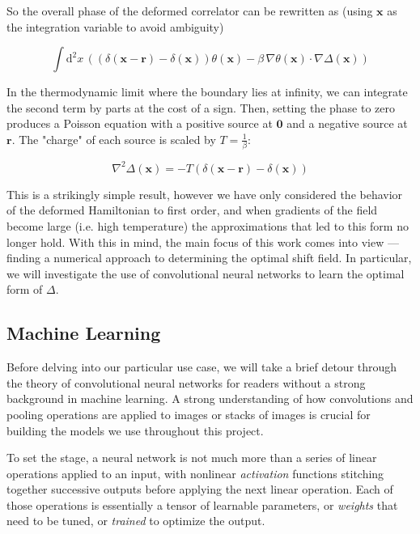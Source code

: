 \documentclass[12pt]{article}
\begin{document}
So the overall phase of the deformed correlator can be rewritten as (using $\mathbf{x}$ as the integration variable to avoid ambiguity)

\begin{equation}
	\int \mathrm{d}^2x \, \left((\delta(\mathbf{x} - \mathbf{r}) - \delta(\mathbf{x}))\theta(\mathbf{x})-\beta \, \nabla\theta(\mathbf{x})\cdot\nabla\Delta(\mathbf{x})\right)
\end{equation}

In the thermodynamic limit where the boundary lies at infinity, we can integrate the second term by parts at the cost of a sign. Then, setting
the phase to zero produces a Poisson equation with a positive source at $\mathbf{0}$ and a negative source at $\mathbf{r}$. The "charge" of each 
source is scaled by $T=\frac{1}{\beta}$:

\begin{equation} \label{eq:Poisson}
	\nabla^2 \Delta(\mathbf{x}) = -T \left( \delta(\mathbf{x} - \mathbf{r}) - \delta(\mathbf{x}) \right)
\end{equation}

This is a strikingly simple result, however we have only considered the behavior of the deformed Hamiltonian to first order, and when gradients
of the field become large (i.e. high temperature) the approximations that led to this form no longer hold. With this in mind, the main focus of 
this work comes into view --- finding a numerical approach to determining the optimal shift field. In particular, we will investigate the use of 
convolutional neural networks to learn the optimal form of $\Delta$.

\subsection{Machine Learning}

Before delving into our particular use case, we will take a brief detour through the theory of convolutional neural networks for readers
without a strong background in machine learning. A strong understanding of how convolutions and pooling operations are applied to images or stacks of images is crucial
for building the models we use throughout this project.  

To set the stage, a neural network is not much more than a series of linear operations applied to an input, with nonlinear \textit{activation}
functions stitching together successive outputs before applying the next linear operation. Each of those operations is essentially a tensor of learnable parameters, or \textit{weights} that need
to be tuned, or \textit{trained} to optimize the output.
\end{document}
